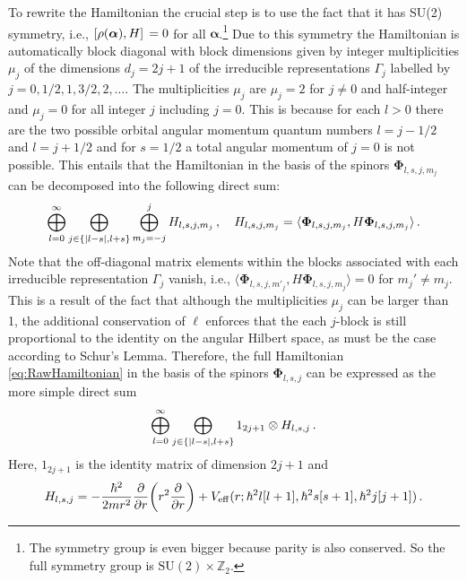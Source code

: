 \documentclass[fontsize=12pt,
               twoside=false,
               BCOR=0mm,
               DIV=14,
               overfullrule=false, %
               toc=bibliography,
               headinclude=true,
               footinclude=false]{scrartcl}
\numberwithin{equation}{section}
\begin{document}
    To rewrite the Hamiltonian the crucial step is to use the fact that it has
    SU(2) symmetry, i.e., $\comm*{\rho(\bm{\alpha})}{H}=0$ for all
    $\bm{\alpha}$.\footnote{The symmetry group is even bigger because parity is
    also conserved. So the full symmetry group is
    $\mathrm{SU}(2)\times\mathbb{Z}_2$.} Due to this symmetry the Hamiltonian is
    automatically block diagonal with block dimensions given by integer
    multiplicities $\mu_j$ of the dimensions $d_j=2j+1$ of the irreducible
    representations $\Gamma_j$ labelled by
    $j=0,1\slash{2},1,3\slash{2},2,\dots$. The multiplicities $\mu_j$ are
    $\mu_{j}=2$ for $j\neq0$ and half-integer and $\mu_j=0$ for all integer $j$
    including $j=0$. This is because for each $l>0$ there are the two possible
    orbital angular momentum quantum numbers $l=j-1\slash{2}$ and
    $l=j+1\slash{2}$ and for $s=1\slash{2}$ a total angular momentum of $j=0$ is
    not possible. This entails that the Hamiltonian in the basis of the spinors
    $\bm{\Phi}_{l,s,j,m_j}$ can be decomposed into the following direct sum:
    \begin{equation}
        \bigoplus^\infty_{l=0}
        \bigoplus_{j \in \{\abs*{l-s},l+s\}}
        \bigoplus^j_{m_j=-j}
        H_{l,s,j,m_j}
    \,, \ \ \
        H_{l,s,j,m_j}
        =
        \langle \bm{\Phi}_{l,s,j,m_j}, H \bm{\Phi}_{l,s,j,m_j} \rangle
    \,.
    \end{equation}
    Note that the off-diagonal matrix elements within the blocks associated with
    each irreducible representation $\Gamma_j$ vanish, i.e.,
    $\langle\bm{\Phi}_{l,s,j,m'_j},H\bm{\Phi}_{l,s,j,m_j}\rangle=0$ for
    $m_j'\neq{m}_j$. This is a result of the fact that although the
    multiplicities $\mu_j$ can be larger than 1, the additional conservation of
    $\ell$ enforces that the each $j$-block is still proportional to the
    identity on the angular Hilbert space, as must be the case according to
    Schur's Lemma. Therefore, the full Hamiltonian \eqref{eq:RawHamiltonian} in
    the basis of the spinors $\bm{\Phi}_{l,s,j}$ can be expressed as the more
    simple direct sum
    \begin{equation}
        \bigoplus^\infty_{l=0}
        \bigoplus_{j \in \{\abs*{l-s},l+s\}}
        1_{2j+1} \otimes H_{l,s,j}
    \,.
    \end{equation}
    Here, $1_{2j+1}$ is the identity matrix of dimension $2j+1$ and
    \begin{equation}\label{eq:BlockHamiltoniansSIUnits}
        H_{l,s,j}
        =
        -\frac{\hbar^2}{2mr^2}\pdv{r}(r^2\pdv{r})
        +
        V_\mathrm{eff}(r;\hbar^2l[l+1],\hbar^2s[s+1],\hbar^2j[j+1])
    \,.
    \end{equation}
\end{document}
